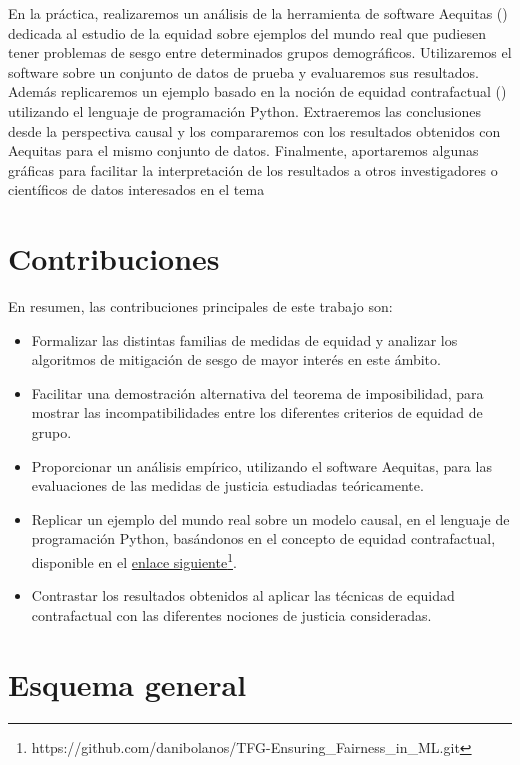 \documentclass[oneside,openright,titlepage,numbers=noenddot,openany,headinclude,footinclude=true,
cleardoublepage=empty,abstractoff,BCOR=5mm,paper=a4,fontsize=12pt,main=spanish]{scrreprt}
\begin{document}
\clearpage

En la práctica, realizaremos un análisis de la herramienta de software Aequitas (\cite{aequitas2019}) dedicada al estudio de la equidad sobre ejemplos del mundo real que pudiesen tener problemas de sesgo entre determinados grupos demográficos. Utilizaremos el software sobre un conjunto de datos de prueba y evaluaremos sus resultados. Además replicaremos un ejemplo basado en la noción de equidad contrafactual (\cite{counterfactual2018}) utilizando el lenguaje de programación Python. Extraeremos las conclusiones desde la perspectiva causal y los compararemos con los resultados obtenidos con Aequitas para el mismo conjunto de datos. Finalmente, aportaremos algunas gráficas para facilitar la interpretación de los resultados a otros investigadores o científicos de datos interesados en el tema

\section{Contribuciones}

En resumen, las contribuciones principales de este trabajo son:

\begin{itemize}
    \item Formalizar las distintas familias de medidas de equidad y analizar los algoritmos de mitigación de sesgo de mayor interés en este ámbito.
    \item Facilitar una demostración alternativa del teorema de imposibilidad, para mostrar las incompatibilidades entre los diferentes criterios de equidad de grupo.
    \item Proporcionar un análisis empírico, utilizando el software Aequitas, para las evaluaciones de las medidas de justicia estudiadas teóricamente.
    \item Replicar un ejemplo del mundo real sobre un modelo causal, en el lenguaje de programación Python, basándonos en el concepto de equidad contrafactual, disponible en el \href{https://github.com/danibolanos/TFG-Ensuring_Fairness_in_ML.git}{enlace siguiente}\footnote{https://github.com/danibolanos/TFG-Ensuring\_Fairness\_in\_ML.git}.
    \item Contrastar los resultados obtenidos al aplicar las técnicas de equidad contrafactual con las diferentes nociones de justicia consideradas.
\end{itemize}

\section{Esquema general}
\end{document}
